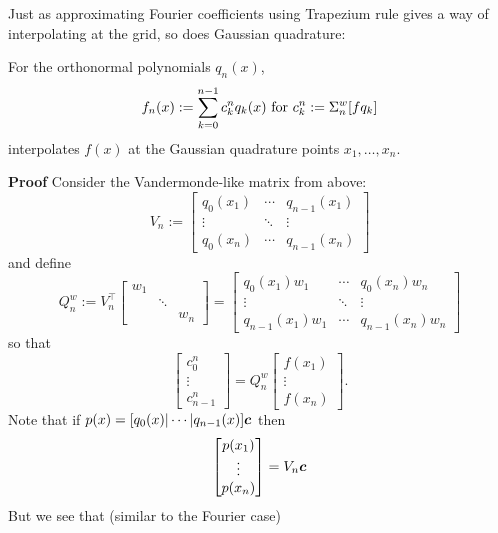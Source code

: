 Just as approximating Fourier coefficients using Trapezium rule gives a way of interpolating at the grid, so does Gaussian quadrature:

\begin{theorem} For the orthonormal polynomials $q_n(x)$,
\[
f_n(x) := \ensuremath{\sum}_{k=0}^{n-1} c_k^n q_k(x)\hbox{ for } c_k^n := \ensuremath{\Sigma}_n^w[f q_k]
\]
interpolates $f(x)$ at the Gaussian quadrature points $x_1,\ensuremath{\ldots},x_n$.

\end{theorem}
\textbf{Proof} Consider the Vandermonde-like matrix from above:
\[
V_n := \begin{bmatrix} q_0(x_1) & \ensuremath{\cdots} & q_{n-1}(x_1) \\
                \ensuremath{\vdots} & \ensuremath{\ddots} & \ensuremath{\vdots} \\
                q_0(x_n) & \ensuremath{\cdots} & q_{n-1}(x_n) \end{bmatrix}
\]
and define
\[
Q_n^w := V_n^\ensuremath{\top} \begin{bmatrix} w_1 \\ &\ensuremath{\ddots} \\&& w_n \end{bmatrix} = \begin{bmatrix} q_0(x_1)w_1 & \ensuremath{\cdots} &  q_0(x_n) w_n \\
                \ensuremath{\vdots} & \ensuremath{\ddots} & \ensuremath{\vdots} \\
                q_{n-1}(x_1) w_1 & \ensuremath{\cdots} & q_{n-1}(x_n)w_n \end{bmatrix}
\]
so that
\[
\begin{bmatrix}
c_0^n \\
\ensuremath{\vdots} \\
c_{n-1}^n \end{bmatrix} = Q_n^w \begin{bmatrix} f(x_1) \\ \ensuremath{\vdots} \\ f(x_n) \end{bmatrix}.
\]
Note that if $p(x) = [q_0(x) | \cdots | q_{n-1}(x)] \bm{{\mbox{\boldmath$c$\unboldmath}}}$ then
\[
\begin{bmatrix}
p(x_1) \\
\vdots \\
p(x_n)
\end{bmatrix} = V_n \bm{{\mbox{\boldmath$c$\unboldmath}}}
\]
But we see that (similar to the Fourier case)
